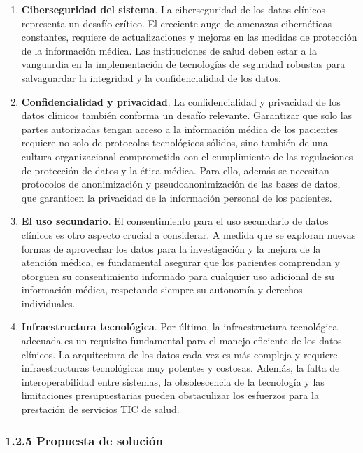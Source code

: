 \begin{enumerate}[label=\roman*.]
    \item \textbf{Ciberseguridad del sistema}. La ciberseguridad de los datos clínicos representa un desafío crítico. El creciente auge de amenazas cibernéticas constantes, requiere de actualizaciones y mejoras en las medidas de protección de la información médica. Las instituciones de salud deben estar a la vanguardia en la implementación de tecnologías de seguridad robustas para salvaguardar la integridad y la confidencialidad de los datos.
    \item \textbf{Confidencialidad y privacidad}.   La confidencialidad y privacidad de los datos clínicos también conforma un desafío relevante. Garantizar que solo las partes autorizadas tengan acceso a la información médica de los pacientes requiere no solo de protocolos tecnológicos sólidos, sino también de una cultura organizacional comprometida con el cumplimiento de las regulaciones de protección de datos y la ética médica. Para ello, además se necesitan protocolos de anonimización y pseudoanonimización de las bases de datos, que garanticen la privacidad de la información personal de los pacientes.
    \item \textbf{El uso secundario}. El consentimiento para el uso secundario de datos clínicos es otro aspecto crucial a considerar. A medida que se exploran nuevas formas de aprovechar los datos para la investigación y la mejora de la atención médica, es fundamental asegurar que los pacientes comprendan y otorguen su consentimiento informado para cualquier uso adicional de su información médica, respetando siempre su autonomía y derechos individuales.
    \item \textbf{Infraestructura tecnológica}. Por último, la infraestructura tecnológica adecuada es un requisito fundamental para el manejo eficiente de los datos clínicos. La arquitectura de los datos cada vez es más compleja y requiere infraestructuras tecnológicas muy potentes y costosas. Además, la falta de interoperabilidad entre sistemas, la obsolescencia de la tecnología y las limitaciones presupuestarias pueden obstaculizar los esfuerzos para la prestación de servicios TIC de salud.
    
\end{enumerate}

\subsubsection{1.2.5 Propuesta de solución}

